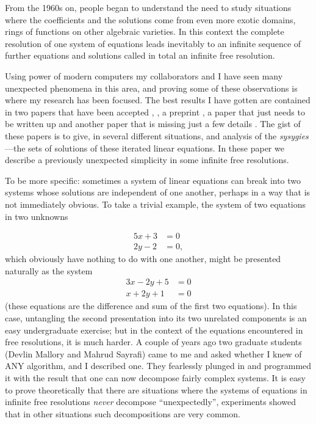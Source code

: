 \documentclass[11pt]{amsart}
\begin{document}
From the 1960s on, people began to understand the need to study situations where the coefficients and the solutions come from even more exotic domains, rings of functions on other algebraic varieties. In this context the complete resolution of one system of equations leads inevitably to an infinite sequence of further equations and solutions called in total an infinite free resolution.
 
   Using  power of modern computers my collaborators and I have seen many unexpected phenomena in this area, and proving some of these observations is where my research has been focused. The best results I have gotten are contained in two papers that have been accepted \cite{de0}, \cite{de0a}, a preprint \cite{de1}, a paper 
 that just needs to be written up \cite{de2} and another paper that is missing just a few details \cite{de3}. The gist of these papers is to give, in several different situations, and analysis of the \emph{sysygies}---the sets of solutions of these
 iterated linear equations. In these paper we describe a previously unexpected simplicity
 in some infinite free resolutions. 
 
 To be more specific: sometimes a system of linear equations can break into two systems whose solutions are independent of one another, perhaps in a way that is not immediately obvious. To take a trivial example, the system of two equations in two unknowns
 
\begin{align*}
 5x+3 &= 0\\
 2y-2&=0,
 \end{align*}
which obviously have nothing to do with one another, might be presented naturally as the system
\begin{align*}
 3x-2y+5&=0\\
x+2y +1 &= 0
 \end{align*}
(these equations are the difference and sum of the first two equations). 
In this case, untangling the second presentation into its two unrelated components is an easy
undergraduate exercise; but in the context of the equations encountered in free resolutions, 
it is much harder. A couple of years ago two graduate students (Devlin Mallory and Mahrud Sayrafi)
 came to me and asked whether
I knew of ANY algorithm, and I described one. They fearlessly plunged in and programmed it
with the result that one can now decompose fairly complex systems. It is easy to prove theoretically
that there are situations where the systems of equations in infinite free resolutions \emph{never}
decompose ``unexpectedly'', experiments showed that in other situations such decompositions
are very common.
\end{document}
